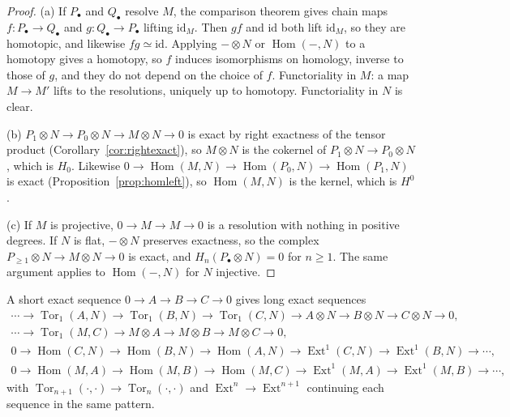 \begin{proof}
(a) If $P_\bullet$ and $Q_\bullet$ resolve $M$, the comparison theorem gives chain maps $f\colon P_\bullet\to Q_\bullet$ and $g\colon Q_\bullet\to P_\bullet$ lifting $\mathrm{id}_M$. Then $gf$ and $\mathrm{id}$ both lift $\mathrm{id}_M$, so they are homotopic, and
likewise $fg\simeq\mathrm{id}$. Applying $-\otimes N$ or $\operatorname{Hom}(-,N)$ to a homotopy gives a homotopy, so $f$ induces isomorphisms on homology, inverse to those of $g$, and they do not depend on the choice of $f$. Functoriality in $M$:
a map $M\to M'$ lifts to the resolutions, uniquely up to homotopy. Functoriality in $N$ is clear.

(b) $P_1\otimes N\to P_0\otimes N\to M\otimes N\to0$ is exact by right exactness of the tensor product (Corollary~\ref{cor:rightexact}), so $M\otimes N$ is the cokernel of $P_1\otimes N\to P_0\otimes N$, which is $H_0$. Likewise
$0\to\operatorname{Hom}(M,N)\to\operatorname{Hom}(P_0,N)\to\operatorname{Hom}(P_1,N)$ is exact (Proposition~\ref{prop:homleft}), so $\operatorname{Hom}(M,N)$ is the kernel, which is $H^0$.

(c) If $M$ is projective, $0\to M\to M\to0$ is a resolution with nothing in positive degrees. If $N$ is flat, $-\otimes N$ preserves exactness, so the complex $P_{\ge1}\otimes N\to M\otimes N\to0$ is exact, and
$H_n(P_\bullet\otimes N)=0$ for $n\ge1$. The same argument applies to $\operatorname{Hom}(-,N)$ for $N$ injective.
\end{proof}

\begin{theorem}\label{thm:les}
A short exact sequence $0\to A\to B\to C\to0$ gives long exact sequences
\[
\begin{gathered}
\cdots\to\operatorname{Tor}_1(A,N)\to\operatorname{Tor}_1(B,N)\to\operatorname{Tor}_1(C,N)\to A\otimes N\to B\otimes N\to C\otimes N\to0,\\
\cdots\to\operatorname{Tor}_1(M,C)\to M\otimes A\to M\otimes B\to M\otimes C\to0,\\
0\to\operatorname{Hom}(C,N)\to\operatorname{Hom}(B,N)\to\operatorname{Hom}(A,N)\to\operatorname{Ext}^1(C,N)\to\operatorname{Ext}^1(B,N)\to\cdots,\\
0\to\operatorname{Hom}(M,A)\to\operatorname{Hom}(M,B)\to\operatorname{Hom}(M,C)\to\operatorname{Ext}^1(M,A)\to\operatorname{Ext}^1(M,B)\to\cdots,
\end{gathered}
\]
with $\operatorname{Tor}_{n+1}(\cdot,\cdot)\to\operatorname{Tor}_n(\cdot,\cdot)$ and $\operatorname{Ext}^n\to\operatorname{Ext}^{n+1}$ continuing each sequence in the same pattern.
\end{theorem}

